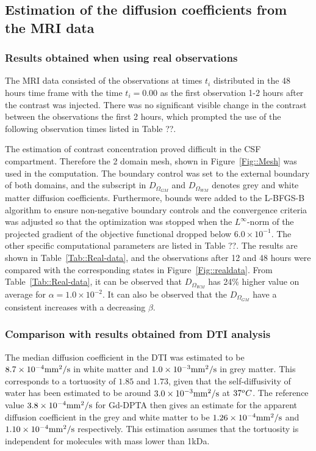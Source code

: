 \documentclass[12pt,a4paper]{article}
\begin{document}
\subsection{Estimation of the diffusion coefficients from the MRI data} 

\subsubsection{Results obtained when using real observations}
The MRI data consisted of the observations at times $t_i$ distributed in the 48 hours time frame with the time $t_i=0.00$ as the first observation 1-2 hours after the contrast was injected. There was no significant visible change in the contrast between the observations the first 2 hours, which prompted the use of the following observation times listed in Table ??.

The estimation of contrast concentration proved difficult in the CSF compartment. Therefore the 2 domain mesh, shown in Figure~\ref{Fig::Mesh} was used in the computation. The boundary control was set to the external boundary of both domains, and the subscript in $D_{\Omega_{GM}}$ and $D_{\Omega_{WM}}$ denotes grey and white matter diffusion coefficients. Furthermore, bounds were added to the L-BFGS-B algorithm to ensure non-negative boundary controls and the convergence criteria was adjusted so that the optimization was stopped when the $L^\infty$-norm of the projected gradient of the objective functional dropped below $6.0\times 10^{-1}$. The other specific  computational parameters are listed in Table ??.
The results are shown in Table~\ref{Tab::Real-data}, and the observations after 12 and 48 hours were compared with the corresponding states in Figure~\ref{Fig::realdata}. From Table~\ref{Tab::Real-data}, it can be observed that $D_{\Omega_{WM}}$ has 24\% higher value on average for $\alpha =1.0\times 10^{-2}$. It can also be observed that the $D_{\Omega_{GM}}$ have a consistent increases with a decreasing $\beta$.

\subsubsection{Comparison with results obtained from DTI analysis}
The median diffusion coefficient in the DTI was estimated to be 
$8.7\times 10\sp{-4} \mathrm{mm\sp{2}/s}$ 
in white matter and 
$1.0\times 10\sp{-3} \mathrm{mm\sp{2}/s}$ 
in grey matter. This corresponds to a tortuosity of $1.85$ and $1.73$, given that the self-diffusivity of water has been estimated to be around $3.0\times 10\sp{-3}\mathrm{mm\sp{2}/s}$ at $37\sp{o}C$. The reference value $3.8\times 10\sp{-4} \mathrm{mm\sp{2}/s}$ for Gd-DPTA then gives an estimate for the apparent diffusion coefficient in the grey and white matter to  be $ 1.26\times 10\sp{-4}\mathrm{mm\sp{2}/s}$ and $1.10\times 10\sp{-4} \mathrm{mm\sp{2}/s}$ respectively. This estimation assumes that the tortuosity is independent for molecules with mass lower than 1kDa. 
\end{document}
